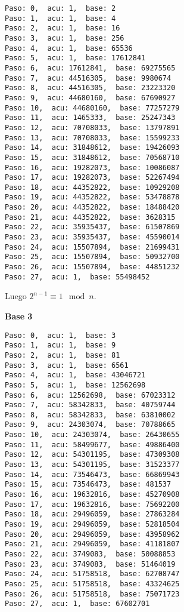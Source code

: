 \documentclass[a4paper]{article}
\begin{document}
\begin{verbatim}
Paso: 0,  acu: 1,  base: 2  
Paso: 1,  acu: 1,  base: 4  
Paso: 2,  acu: 1,  base: 16  
Paso: 3,  acu: 1,  base: 256  
Paso: 4,  acu: 1,  base: 65536  
Paso: 5,  acu: 1,  base: 17612841  
Paso: 6,  acu: 17612841,  base: 69275565  
Paso: 7,  acu: 44516305,  base: 9980674  
Paso: 8,  acu: 44516305,  base: 23223320  
Paso: 9,  acu: 44680160,  base: 67690927  
Paso: 10,  acu: 44680160,  base: 77257279  
Paso: 11,  acu: 1465333,  base: 25247343  
Paso: 12,  acu: 70708033,  base: 13797891  
Paso: 13,  acu: 70708033,  base: 15599233  
Paso: 14,  acu: 31848612,  base: 19426093  
Paso: 15,  acu: 31848612,  base: 70568710  
Paso: 16,  acu: 19282073,  base: 10086087  
Paso: 17,  acu: 19282073,  base: 52267494  
Paso: 18,  acu: 44352822,  base: 10929208  
Paso: 19,  acu: 44352822,  base: 53478878  
Paso: 20,  acu: 44352822,  base: 18488420  
Paso: 21,  acu: 44352822,  base: 3628315  
Paso: 22,  acu: 35935437,  base: 61507869  
Paso: 23,  acu: 35935437,  base: 45590014  
Paso: 24,  acu: 15507894,  base: 21699431  
Paso: 25,  acu: 15507894,  base: 50932700  
Paso: 26,  acu: 15507894,  base: 44851232  
Paso: 27,  acu: 1,  base: 55498452  
\end{verbatim}

Luego $2^{n-1}\equiv 1 \mod n$.

\textbf{Base 3}
\begin{verbatim}
Paso: 0,  acu: 1,  base: 3  
Paso: 1,  acu: 1,  base: 9  
Paso: 2,  acu: 1,  base: 81  
Paso: 3,  acu: 1,  base: 6561  
Paso: 4,  acu: 1,  base: 43046721  
Paso: 5,  acu: 1,  base: 12562698  
Paso: 6,  acu: 12562698,  base: 67023312  
Paso: 7,  acu: 58342833,  base: 40759744  
Paso: 8,  acu: 58342833,  base: 63810002  
Paso: 9,  acu: 24303074,  base: 70788665  
Paso: 10,  acu: 24303074,  base: 26430655  
Paso: 11,  acu: 58499677,  base: 49886400  
Paso: 12,  acu: 54301195,  base: 47309308  
Paso: 13,  acu: 54301195,  base: 31523377  
Paso: 14,  acu: 73546473,  base: 66869943  
Paso: 15,  acu: 73546473,  base: 481537  
Paso: 16,  acu: 19632816,  base: 45270908  
Paso: 17,  acu: 19632816,  base: 75692200  
Paso: 18,  acu: 29496059,  base: 27863284  
Paso: 19,  acu: 29496059,  base: 52818504  
Paso: 20,  acu: 29496059,  base: 43958962  
Paso: 21,  acu: 29496059,  base: 41181807  
Paso: 22,  acu: 3749083,  base: 50088853  
Paso: 23,  acu: 3749083,  base: 51464019  
Paso: 24,  acu: 51758518,  base: 62708747  
Paso: 25,  acu: 51758518,  base: 43324625  
Paso: 26,  acu: 51758518,  base: 75071723  
Paso: 27,  acu: 1,  base: 67602701 
\end{verbatim}
\end{document}
